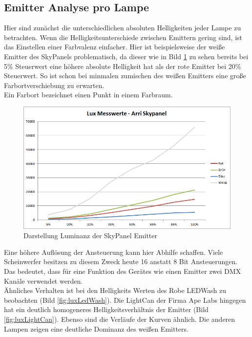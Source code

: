 \documentclass[11pt]{scrartcl}
\begin{document}
\subsection{Emitter Analyse pro Lampe} \label{emitterColorDrit}
Hier sind zunächst die unterschiedlichen absoluten Helligkeiten jeder Lampe zu betrachten. Wenn die Helligkeitsunterschiede zwischen Emittern gering sind, ist
das Einstellen einer Farbvalenz einfacher. Hier ist beispielsweise der weiße Emitter des SkyPanels problematisch, da dieser wie in Bild \ref{fig:luxSkypanel} 
zu sehen bereits bei 5\% Steuerwert eine höhere absolute Helligkeit hat als der rote Emitter bei 20\% Steuerwert. So ist schon bei minmalen zumischen des weißen
Emitters eine große Farbortverschiebung zu erwarten.\\
Ein Farbort bezeichnet einen Punkt in einem Farbraum.
\begin{figure}[H]
    \begin{center}
        \includegraphics[width=.8\textwidth]{images/charts/skypanel.png}
    \end{center}
    \vspace{-.4cm}
    \caption{Darstellung Luminanz der SkyPanel Emitter} \label{fig:luxSkypanel}
\end{figure}
\noindent
Eine höhere Auflösung der Ansteuerung kann hier Abhilfe schaffen. Viele Scheinwerfer besitzen zu diesem Zweck heute 16 anstatt 8 Bit Ansteuerungen. Das bedeutet,
dass für eine Funktion des Gerätes wie einen Emitter zwei DMX Kanäle verwendet werden.\\
Ähnliches Verhalten ist bei den Helligkeits Werten des Robe LEDWash zu beobachten (Bild \ref{fig:luxLedWash}). Die LightCan der Firma Ape Labs hingegen hat ein
deutlich homogeneres Helligkeitsverhältnis der Emitter (Bild \ref{fig:luxLightCan}). Ebenso sind die Verläufe der Kurven ähnlich. Die anderen Lampen zeigen eine
deutliche Dominanz des weißen Emitters.
\end{document}
